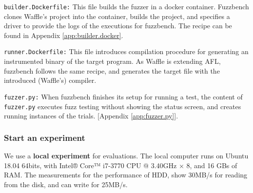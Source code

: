 \begin{itemize}
    \begin{sloppypar}
    \item \texttt{builder.Dockerfile:} This file builds the fuzzer in a docker container. Fuzzbench clones Waffle's project into the container, builds the project, and specifies a driver to provide the logs of the executions for fuzzbench. The recipe can be found in Appendix \ref{app:builder.docker}.
    \end{sloppypar}
    \item \texttt{runner.Dockerfile:} This file introduces compilation procedure for generating an instrumented binary of the target program. As Waffle is extending AFL, fuzzbench follows the same recipe, and generates the target file with the introduced (Waffle's) compiler.
    
    \item \texttt{fuzzer.py:} When fuzzbench finishes its setup for running a test, the content of \texttt{fuzzer.py} executes fuzz testing without showing the status screen, and creates running instances of the trials. [Appendix \ref{app:fuzzer.py}].
\end{itemize}

\subsubsection{Start an experiment}

We use a \textbf{local experiment} for evaluations. The local computer runs on Ubuntu 18.04 64bits, with Intel® Core™ i7-3770 CPU @ 3.40GHz × 8, and 16 GBs of RAM. The measurements for the performance of HDD, show 30MB/s for reading from the disk, and can write for 25MB/s.
